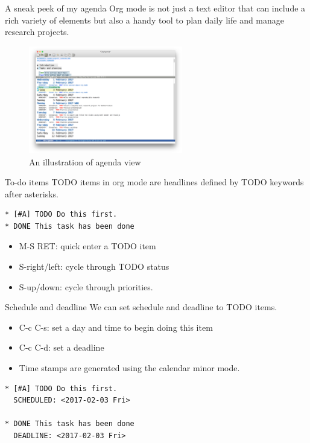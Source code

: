 \documentclass[presentation]{beamer}
\begin{document}
\begin{frame}[label={sec:org05568ed}]{A sneak peek of my agenda}
Org mode is not just a text editor that can include a rich variety of
elements but also a handy tool to plan daily life and manage
research projects.

\begin{figure}[htbp]
\centering
\includegraphics[width=0.6\textwidth,height=0.5\textheight]{figure/agenda_example.png}
\caption{An illustration of agenda view}
\end{figure}
\end{frame}


\begin{frame}[fragile,label={sec:org2188ae0}]{To-do items}
 TODO items in org mode are headlines defined by TODO keywords after
asterisks.

\begin{verbatim}
* [#A] TODO Do this first.
* DONE This task has been done
\end{verbatim}

\begin{itemize}
\item M-S RET: quick enter a TODO item
\item S-right/left: cycle through TODO status
\item S-up/down: cycle through priorities.
\end{itemize}
\end{frame}


\begin{frame}[fragile,label={sec:org0427206}]{Schedule and deadline}
 We can set schedule and deadline to TODO items.

\begin{itemize}
\item C-c C-s: set a day and time to begin doing this item
\item C-c C-d: set a deadline
\item Time stamps are generated using the calendar minor mode.
\end{itemize}

\begin{verbatim}
* [#A] TODO Do this first.
  SCHEDULED: <2017-02-03 Fri>

* DONE This task has been done
  DEADLINE: <2017-02-03 Fri>
\end{verbatim}
\end{frame}
\end{document}
